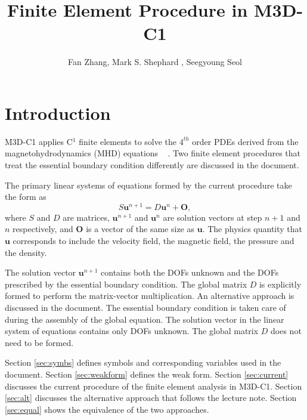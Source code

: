 \documentclass[11pt]{article}  %
\title{Finite Element Procedure in M3D-C1}
\author{Fan Zhang, Mark S. Shephard , Seegyoung Seol}
\begin{document}
 
\maketitle

\section{Introduction} \label{sec:intro}
M3D-C1 applies C$^1$ finite elements to solve the $4^{th}$ order PDEs derived from the magnetohydrodynamics (MHD) equations ~\cite{jardin2004triangular, jardin2012multiple} . Two finite element procedures that treat the essential boundary condition differently are discussed in the document.
  
The primary linear systems of equations formed by the current  procedure take the form as 
\begin{equation}
S \mathbf{u}^{n+1} = D \mathbf{u}^n +\mathbf{O}, \label{eqn:sys}
\end{equation}
where $S$ and $D$ are matrices, $\mathbf{u}^{n+1}$ and $\mathbf{u}^{n}$ are solution vectors at step $n+1$ and $n$ respectively, and $\mathbf{O}$ is a vector of the same size as $\mathbf{u} $. The physics quantity that $\mathbf{u}$ corresponds to include the velocity field, the magnetic field, the pressure and the density. 

The solution vector  $\mathbf{u}^{n+1}$ contains both the DOFs unknown and the DOFs prescribed by the essential boundary condition. The global matrix $D$ is explicitly formed to perform the matrix-vector multiplication. An alternative approach is discussed in the document. The essential boundary condition is  taken care of during the assembly of the global equation. The solution vector in the linear system of equations contains only DOFs unknown. The global matrix $D$ does not need to be formed.

Section \ref{sec:symbs} defines symbols and corresponding variables used in the document. Section \ref{sec:weakform} defines the weak form. Section \ref{sec:current} discusses the current procedure of the finite element analysis in M3D-C1. Section \ref{sec:alt} discusses the alternative approach that follows the lecture note. Section \ref{sec:equal} shows the equivalence of the two approaches.
\end{document}
